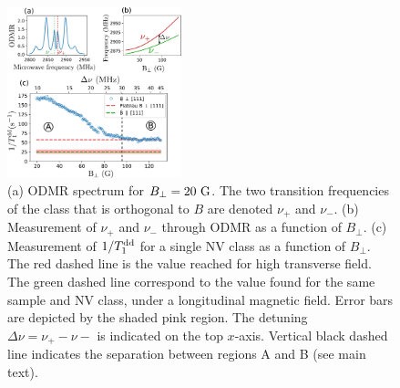 \documentclass[preprintnumbers,amsmath,amssymb,superscriptaddress,twocolumn,showpacs]{revtex4-2}
\begin{document}
\begin{figure}
\includegraphics[width=0.45\textwidth]{fig_transverse_field_V3.pdf}
\caption{(a) ODMR spectrum for $B_\perp=20\ \rm G$. The two transition frequencies of the class that is orthogonal to $B$ are denoted $\nu_+$ and $\nu_-$. (b) Measurement of $\nu_+$ and $\nu_-$ through ODMR as a function of $B_\perp$. (c) Measurement of $1/T_1^{\rm dd}$ for a single NV class as a function of $B_\perp$. The red dashed line is the value reached for high transverse field. The green dashed line correspond to the value found for the same sample and NV class, under a longitudinal magnetic field. Error bars are depicted by the shaded pink region. The detuning $\Delta \nu = \nu_+-\nu-$ is indicated on the top $x$-axis. Vertical black dashed line indicates the separation between regions A and B (see main text).}
\label{B_transverse}
\end{figure}
\end{document}
